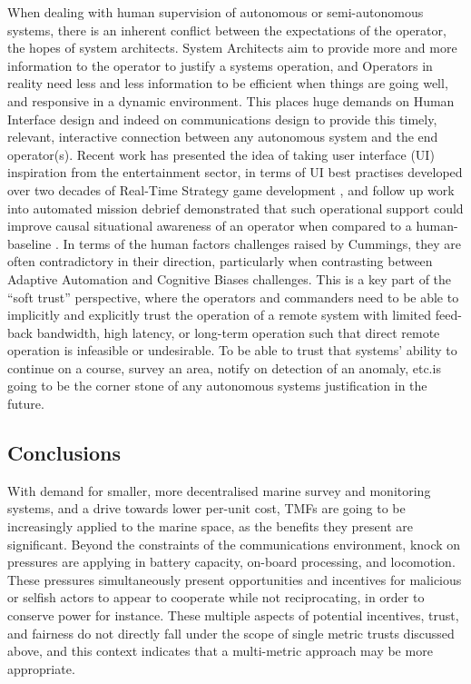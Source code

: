 When dealing with human supervision of autonomous or semi-autonomous systems, there is an inherent conflict between the expectations of the operator, the hopes of system architects.
System Architects aim to provide more and more information to the operator to justify a systems operation, and Operators in reality need less and less information to be efficient when things are going well, and responsive in a dynamic environment.
This places huge demands on Human Interface design and indeed on communications design to provide this timely, relevant, interactive connection between any autonomous system and the end operator(s).
Recent work has presented the idea of taking user interface (UI) inspiration from the entertainment sector, in terms of UI best practises developed over two decades of Real-Time Strategy game development \cite{Johnson2007}, and follow up work into automated mission debrief demonstrated that such operational support could improve causal situational awareness of an operator when compared to a human-baseline \cite{Johnson2011}.
In terms of the human factors challenges raised by Cummings, they are often contradictory in their direction, particularly when contrasting between Adaptive Automation and Cognitive Biases challenges.
This is a key part of the ``soft trust'' perspective, where the operators and commanders need to be able to implicitly and explicitly trust the operation of a remote system with limited feed-back bandwidth, high latency, or long-term operation such that direct remote operation is infeasible or undesirable.
To be able to trust that systems’ ability to continue on a course, survey an area, notify on detection of an anomaly, etc.is going to be the corner stone of any autonomous systems justification in the future.

\subsection{Conclusions}
With demand for smaller, more decentralised marine survey and monitoring systems, and a drive towards lower per-unit cost, TMFs are going to be increasingly applied to the marine space, as the benefits they present are significant.
Beyond the constraints of the communications environment, knock on pressures are applying in battery capacity, on-board processing, and locomotion.
These pressures simultaneously present opportunities and incentives for malicious or selfish actors to appear to cooperate while not reciprocating, in order to conserve power for instance.
These multiple aspects of potential incentives, trust, and fairness do not directly fall under the scope of single metric trusts discussed above, and this context indicates that a multi-metric approach may be more appropriate.

